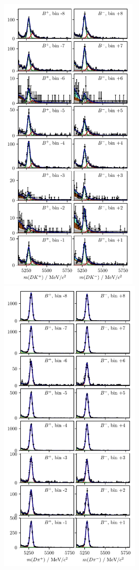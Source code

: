 \begin{figure}[tp]
    \centering
    \includegraphics[height=6in]{figures/analysis/bin_by_bin/pretty_fit_bins_dk_DD_1.pdf}
    \includegraphics[height=6in]{figures/analysis/bin_by_bin/pretty_fit_bins_dpi_DD_1.pdf}

\end{figure}
